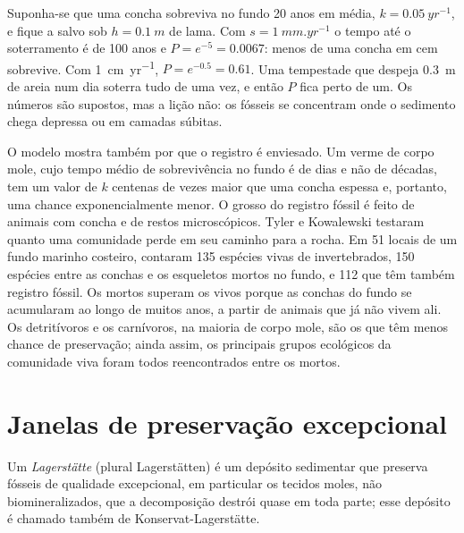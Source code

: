 \begin{example}\label{ex:b2:palaeoenvironments:shell}
Suponha-se que uma concha sobreviva no fundo 20 anos em média, $k = \qty{0.05}{yr^{-1}}$, e fique
a salvo sob $h = \qty{0.1}{m}$ de lama. Com $s = \qty{1}{mm.yr^{-1}}$ o tempo até o soterramento é de 100
anos e $P = e^{-5} = 0.0067$: menos de uma concha em cem sobrevive. Com
\qty{1}{cm.yr^{-1}}, $P = e^{-0.5} = 0.61$. Uma tempestade que despeja \qty{0.3}{m} de areia num dia
soterra tudo de uma vez, e então $P$ fica perto de um. Os números são supostos, mas a lição
não: os fósseis se concentram onde o sedimento chega depressa ou em camadas súbitas.
\end{example}

O modelo mostra também por que o registro é enviesado. Um verme de corpo mole, cujo tempo médio de sobrevivência no
fundo é de dias e não de décadas, tem um valor de $k$ centenas de vezes maior que uma concha
espessa e, portanto, uma chance exponencialmente menor. O grosso do registro fóssil é feito de animais
com concha e de restos microscópicos. Tyler e Kowalewski testaram quanto uma comunidade perde em
seu caminho para a rocha. Em 51 locais de um fundo marinho costeiro, contaram 135 espécies vivas de
invertebrados, 150 espécies entre as conchas e os esqueletos mortos no fundo, e 112 que
têm também registro fóssil. Os mortos superam os vivos porque as conchas do fundo se acumularam
ao longo de muitos anos, a partir de animais que já não vivem ali. Os detritívoros e os carnívoros, na maioria
de corpo mole, são os que têm menos chance de preservação; ainda assim, os principais grupos ecológicos da comunidade
viva foram todos reencontrados entre os mortos.

\section{Janelas de preservação excepcional}\label{sec:b2:palaeoenvironments:lagerstatten}

\begin{definition}[Lagerstätte]\label{def:b2:palaeoenvironments:lagerstatte}
Um \emph{Lagerstätte} (plural Lagerstätten) é um depósito sedimentar que
preserva fósseis de qualidade excepcional, em particular os tecidos moles, não biomineralizados, que
a decomposição destrói quase em toda parte; esse depósito é chamado também de Konservat-Lagerstätte.
\end{definition}

